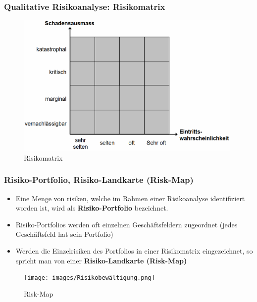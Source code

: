 \documentclass[10pt,a4paper]{article}
\begin{document}
\subsubsection*{Qualitative Risikoanalyse: Risikomatrix}
\begin{figure}[H]
    \begin{center}
    \includegraphics[width=11cm]{images/Risikomatrix.png}
    \caption{Risikomatrix}
    \label{Risikomatrix}
    \end{center}
\end{figure}

\subsubsection*{Risiko-Portfolio, Risiko-Landkarte (Risk-Map)}
\begin{itemize}[noitemsep,topsep=0pt,leftmargin=*]
    \item Eine Menge von risiken, welche im Rahmen einer Risikoanalyse identifiziert worden ist, wird als \textbf{Risiko-Portfolio} bezeichnet.
    \item Risiko-Portfolios werden oft einzelnen Geschäftsfeldern zugeordnet (jedes Geschäftsfeld hat sein Portfolio)
    \item Werden die Einzelrisiken des Portfolios in einer Risikomatrix eingezeichnet, so spricht man von einer \textbf{Risiko-Landkarte (Risk-Map)}
\end{itemize}

\begin{figure}[H]
    \begin{center}
    \texttt{[image: images/Risikobewältigung.png]}
    \caption{Risk-Map}
    \label{Risk-Map}
    \end{center}
\end{figure}
\end{document}
